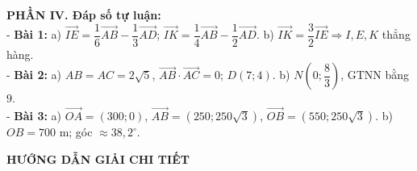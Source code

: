 \documentclass[10pt,a4paper]{article}
\begin{document}
\vspace{5pt}
\noindent\textbf{PHẦN IV. Đáp số tự luận:}\\[2pt]
- \textbf{Bài 1:} a) $\vec{IE} = \dfrac{1}{6}\vec{AB} - \dfrac{1}{3}\vec{AD}$; $\vec{IK} = \dfrac{1}{4}\vec{AB} - \dfrac{1}{2}\vec{AD}$. b) $\vec{IK} = \dfrac{3}{2}\vec{IE} \Rightarrow I, E, K$ thẳng hàng.\\
- \textbf{Bài 2:} a) $AB = AC = 2\sqrt{5}$, $\vec{AB}\cdot\vec{AC}=0$; $D(7; 4)$. b) $N\!\left(0; \dfrac{8}{3}\right)$, GTNN bằng $9$.\\
- \textbf{Bài 3:} a) $\vec{OA} = (300; 0)$, $\vec{AB} = (250; 250\sqrt{3})$, $\vec{OB} = (550; 250\sqrt{3})$. b) $OB = 700\text{ m}$; góc $\approx 38{,}2^\circ$.

\vspace{4pt}
\begin{center}
  {\large\bfseries\color{ink} HƯỚNG DẪN GIẢI CHI TIẾT}
\end{center}
\vspace{1pt}
\end{document}
